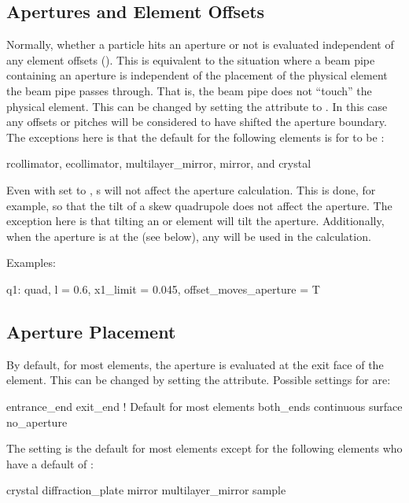 \subsection{Apertures and Element Offsets}

Normally, whether a particle hits an aperture or not is evaluated
independent of any element offsets (). This is
equivalent to the situation where a beam pipe containing an aperture
is independent of the placement of the physical element the beam pipe
passes through. That is, the beam pipe does not ``touch'' the physical
element. This can be changed by setting the 
attribute to . In this case any offsets or pitches will be
considered to have shifted the aperture boundary. The exceptions here
is that the default for the following elements is for
 to be :
\begin{example}
  rcollimator, 
  ecollimator,
  multilayer_mirror, 
  mirror, and 
  crystal 
\end{example}

Even with  set to , s will
not affect the aperture calculation. This is done, for example, so
that the tilt of a skew quadrupole does not affect the aperture. The
exception here is that tilting an  or 
element will tilt the aperture. Additionally, when the aperture is at
the  (see below), any  will be used in the
calculation.

Examples:
\begin{example}
  q1: quad, l = 0.6, x1_limit = 0.045, offset_moves_aperture = T
\end{example}

\subsection{Aperture Placement}

By default, for most elements, the aperture is evaluated at the exit face of the
element. This can be changed by setting the  attribute.
Possible settings for  are:
\begin{example}
  entrance_end
  exit_end       ! Default for most elements
  both_ends
  continuous
  surface  
  no_aperture
\end{example}
The  setting is the default for most elements except for
the following elements who have a default of :
\begin{example}
  crystal
  diffraction_plate
  mirror
  multilayer_mirror
  sample
\end{example}

